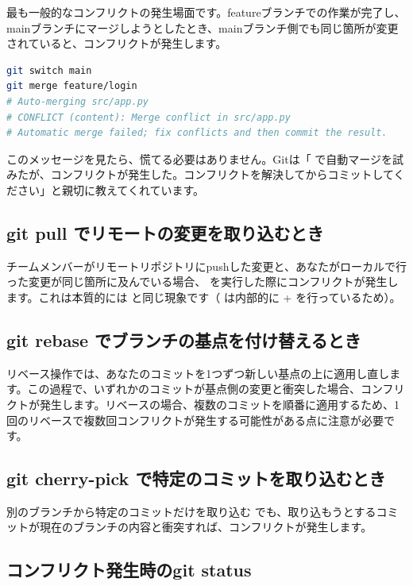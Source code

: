 最も一般的なコンフリクトの発生場面です。featureブランチでの作業が完了し、mainブランチにマージしようとしたとき、mainブランチ側でも同じ箇所が変更されていると、コンフリクトが発生します。

\begin{lstlisting}[language=bash]
git switch main
git merge feature/login
# Auto-merging src/app.py
# CONFLICT (content): Merge conflict in src/app.py
# Automatic merge failed; fix conflicts and then commit the result.
\end{lstlisting}

このメッセージを見たら、慌てる必要はありません。Gitは「 で自動マージを試みたが、コンフリクトが発生した。コンフリクトを解決してからコミットしてください」と親切に教えてくれています。

\subsection{git pull でリモートの変更を取り込むとき}

チームメンバーがリモートリポジトリにpushした変更と、あなたがローカルで行った変更が同じ箇所に及んでいる場合、 を実行した際にコンフリクトが発生します。これは本質的には  と同じ現象です（ は内部的に  +  を行っているため）。

\subsection{git rebase でブランチの基点を付け替えるとき}

リベース操作では、あなたのコミットを1つずつ新しい基点の上に適用し直します。この過程で、いずれかのコミットが基点側の変更と衝突した場合、コンフリクトが発生します。リベースの場合、複数のコミットを順番に適用するため、1回のリベースで複数回コンフリクトが発生する可能性がある点に注意が必要です。

\subsection{git cherry-pick で特定のコミットを取り込むとき}

別のブランチから特定のコミットだけを取り込む  でも、取り込もうとするコミットが現在のブランチの内容と衝突すれば、コンフリクトが発生します。

\subsection{コンフリクト発生時のgit status}

